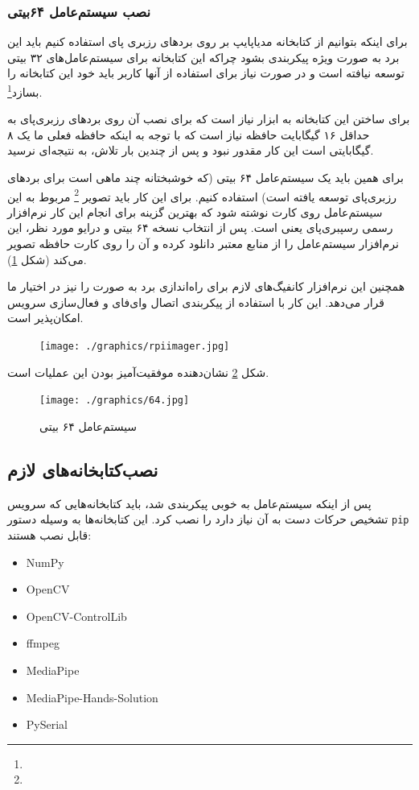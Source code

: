 \documentclass{article}
\begin{document}
\subsubsection{نصب سیستم‌عامل ۶۴بیتی}
برای اینکه بتوانیم از کتابخانه مدیاپایپ بر روی بردهای رزبری پای استفاده کنیم باید این برد به صورت ویژه پیکربندی بشود چراکه این کتابخانه برای سیستم‌عامل‌های ۳۲ بیتی توسعه نیافته است و در صورت نیاز برای استفاده از آنها کاربر باید خود این کتابخانه را بسازد\footnote{}.

برای ساختن این کتابخانه به ابزار  نیاز است که برای نصب آن روی برد‌های رزبری‌پای به حداقل ۱۶ گیگابایت حافظه نیاز است که با توجه به اینکه حافظه فعلی ما یک  ۸ گیگابایتی است این کار مقدور نبود و پس از چندین بار تلاش، به نتیجه‌ای نرسید.

برای همین باید یک سیستم‌عامل ۶۴ بیتی (که خوشبختانه چند ماهی ‌است برای بردهای رزبری‌پای توسعه‌ یافته است) استفاده کنیم. برای این کار باید تصویر \footnote{} مربوط به این سیستم‌عامل روی  کارت نوشته شود که بهترین گزینه برای انجام این کار نرم‌افزار رسمی رسپبری‌پای یعنی  است. پس از انتخاب نسخه ۶۴ بیتی و درایو مورد نظر، این نرم‌افزار سیستم‌عامل را از منابع معتبر دانلود کرده و آن را روی کارت حافظه تصویر می‌کند (شکل \ref{RPi Imager}).

همچنین این نرم‌افزار کانفیگ‌های لازم برای راه‌اندازی برد به صورت  را نیز در اختیار ما قرار می‌دهد. این کار با استفاده از پیکربندی اتصال وای‌فای و فعال‌سازی سرویس  امکان‌پذیر است.

\begin{figure}
	\centering
	\texttt{[image: ./graphics/rpiimager.jpg]}
	\caption{}
	\label{RPi Imager}
\end{figure}

شکل \ref{64} نشان‌دهنده موفقیت‌آمیز بودن این عملیات است.

\begin{figure}
	\centering
	\texttt{[image: ./graphics/64.jpg]}
	\caption{سیستم‌عامل ۶۴ بیتی}
	\label{64}
\end{figure}

\subsection{نصب‌کتابخانه‌های لازم}
پس از اینکه سیستم‌عامل به خوبی پیکربندی شد، باید کتابخانه‌هایی که سرویس تشخیص حرکات دست به آن نیاز دارد را نصب کرد. این کتابخانه‌ها به وسیله دستور
\verb~pip~
قابل نصب هستند:
\begin{latin}
    \begin{itemize}
        \item NumPy
        \item OpenCV
        \item OpenCV-ControlLib
        \item ffmpeg
        \item MediaPipe
        \item MediaPipe-Hands-Solution
        \item PySerial
    \end{itemize}
\end{latin}
\end{document}
